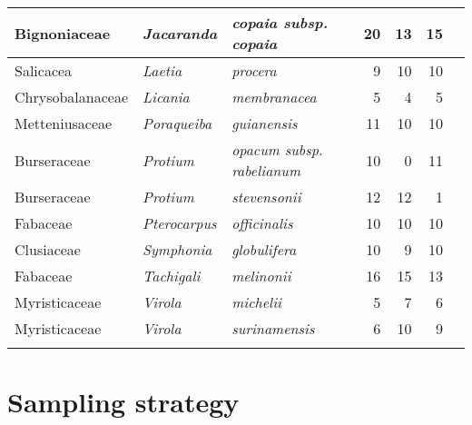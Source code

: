 \documentclass[
]{book}
\begin{document}
\begin{table}
\begin{tabular}[t]{l|>{}l|>{}l|r|r|r|>{}r}
\hline
Bignoniaceae & \em{Jacaranda} & \em{copaia subsp. copaia} & 20 & 13 & 15 & \cellcolor[HTML]{666;}{\textcolor{white}{96}}\\
\hline
Salicacea & \em{Laetia} & \em{procera} & 9 & 10 & 10 & \cellcolor[HTML]{666;}{\textcolor{white}{58}}\\
\hline
Chrysobalanaceae & \em{Licania} & \em{membranacea} & 5 & 4 & 5 & \cellcolor[HTML]{666;}{\textcolor{white}{28}}\\
\hline
Metteniusaceae & \em{Poraqueiba} & \em{guianensis} & 11 & 10 & 10 & \cellcolor[HTML]{666;}{\textcolor{white}{62}}\\
\hline
Burseraceae & \em{Protium} & \em{opacum subsp. rabelianum} & 10 & 0 & 11 & \cellcolor[HTML]{666;}{\textcolor{white}{42}}\\
\hline
Burseraceae & \em{Protium} & \em{stevensonii} & 12 & 12 & 1 & \cellcolor[HTML]{666;}{\textcolor{white}{50}}\\
\hline
Fabaceae & \em{Pterocarpus} & \em{officinalis} & 10 & 10 & 10 & \cellcolor[HTML]{666;}{\textcolor{white}{60}}\\
\hline
Clusiaceae & \em{Symphonia} & \em{globulifera} & 10 & 9 & 10 & \cellcolor[HTML]{666;}{\textcolor{white}{58}}\\
\hline
Fabaceae & \em{Tachigali} & \em{melinonii} & 16 & 15 & 13 & \cellcolor[HTML]{666;}{\textcolor{white}{88}}\\
\hline
Myristicaceae & \em{Virola} & \em{michelii} & 5 & 7 & 6 & \cellcolor[HTML]{666;}{\textcolor{white}{36}}\\
\hline
Myristicaceae & \em{Virola} & \em{surinamensis} & 6 & 10 & 9 & \cellcolor[HTML]{666;}{\textcolor{white}{50}}\\
\hline
\cellcolor[HTML]{666;}{\textcolor{white}{Total}} & \cellcolor[HTML]{666;}{\textcolor{white}{\em{-}}} & \cellcolor[HTML]{666;}{\textcolor{white}{\em{-}}} & \cellcolor[HTML]{666;}{\textcolor{white}{226}} & \cellcolor[HTML]{666;}{\textcolor{white}{181}} & \cellcolor[HTML]{666;}{\textcolor{white}{145}} & \cellcolor[HTML]{666;}{\textcolor{white}{\cellcolor[HTML]{666;}{1104}}}\\
\hline
\end{tabular}
\end{table}

\hypertarget{sampling-strategy}{%
\section{Sampling strategy}\label{sampling-strategy}}
\end{document}
